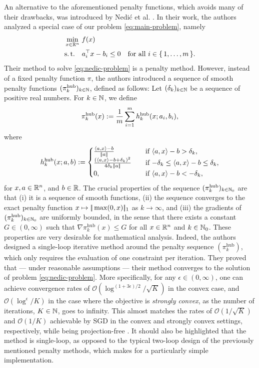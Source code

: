 An alternative to the aforementioned penalty functions, which avoids many of their drawbacks,
was introduced by Nedić et al. \cite{nedich2023huber}. In their work,
the authors analyzed a special case of our problem \eqref{eq:main-problem}, namely
\begin{equation}
    \label{eq:nedic-problem}
    \begin{aligned}
    &\min_{x \in \mathbb{R}^n} \, f(x) \\
    &\textup{s.\,t.} \quad a_i^\top x - b_i \leq 0 \quad \textnormal{for all $i\in\{\, 1,\dots,m \,\}$}.
    \end{aligned}
\end{equation}
Their method to solve \eqref{eq:nedic-problem} is a penalty method. However,
instead of a fixed penalty function $\pi$, the authors
introduced a sequence of smooth penalty functions $(\pi^{\textnormal{hub}}_k)_{k\in\mathbb{N}}$,
defined as follows: Let $(\delta_k)_{k\in\mathbb{N}}$ be a sequence of positive real numbers. For $k\in\mathbb{N}$, we define
\[
    \pi_k^\textnormal{hub}(x) := \frac{1}{m} \sum_{i=1}^{m} h_k^{\text{hub}}(x; a_i, b_i),
\]
where
\[
    h_k^{\text{hub}}(x; a, b)
    :=
    \begin{cases}
        \frac{\langle a, x \rangle - b}{|\!|a|\!|} \quad&\textnormal{if $\langle a, x \rangle - b > \delta_k$}, \\
        \frac{(\langle a, x \rangle - b + \delta_k)^2}{4\delta_k |\!|a|\!|} \quad&\textnormal{if $-\delta_k \leq \langle a, x \rangle - b \leq \delta_k$}, \\
        0, \quad&\textnormal{if $\langle a, x \rangle - b < -\delta_k$},
    \end{cases}
\]
for $x,a \in\mathbb{R}^n$, and $b\in\mathbb{R}$. The crucial properties of the sequence $(\pi_k^\text{hub})_{k\in\mathbb{N}_0}$
are that (i) it is a sequence of smooth functions, (ii) the sequence converges to the exact penalty function $x\mapsto|\!|\max(0, x)|\!|_1$
as $k\to\infty$, and (iii) the gradients of $(\pi_k^\text{hub})_{k\in\mathbb{N}_0}$ are uniformly bounded, in the sense that
there exists a constant $G\in(0,\infty)$ such that
$\nabla \pi_k^\text{hub}(x) \leq G$ for all $x\in\mathbb{R}^n$ and $k\in\mathbb{N}_0$.
These properties are very desirable for mathematical analysis.
Indeed,
the authors designed a single-loop iterative method around the penalty sequence $(\pi_k^\text{hub})$,
which only requires the evaluation of one constraint per iteration. They proved that
--- under reasonable assumptions --- their method converges to the solution of problem \eqref{eq:nedic-problem}.
More specifically, for any $\epsilon\in(0,\infty)$,
one can achieve convergence rates of $\mathcal{O}(\log^{(1+3\epsilon)/2} / \sqrt{K})$ in the convex case, and
$\mathcal{O}(\log^{\epsilon} / K)$ in the case where the objective is \textit{strongly convex},
as the number of iterations, $K\in\mathbb{N}$, goes to infinity.
This almost matches the rates of $\mathcal{O}(1/\sqrt{K})$ and $\mathcal{O}(1/K)$
achievable by SGD in the convex and strongly convex settings, respectively, while being projection-free \cite{robbins1971convergence,nemirovski2009robust}.
It should also be highlighted that the method is single-loop, as opposed to the typical
two-loop design of the previously mentioned penalty methods,
which makes for a particularly simple implementation.

